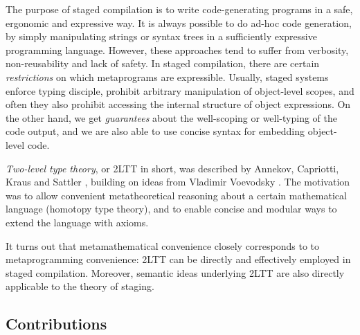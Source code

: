 \documentclass[acmsmall]{acmart}
\theoremstyle{remark}
\begin{document}
The purpose of staged compilation is to write code-generating programs in a
safe, ergonomic and expressive way. It is always possible to do ad-hoc code
generation, by simply manipulating strings or syntax trees in a sufficiently
expressive programming language. However, these approaches tend to suffer from
verbosity, non-reusability and lack of safety. In staged compilation, there are
certain \emph{restrictions} on which metaprograms are expressible. Usually,
staged systems enforce typing disciple, prohibit arbitrary manipulation of
object-level scopes, and often they also prohibit accessing the internal
structure of object expressions. On the other hand, we get \emph{guarantees}
about the well-scoping or well-typing of the code output, and we are also able
to use concise syntax for embedding object-level code.

\emph{Two-level type theory}, or 2LTT in short, was described by Annekov,
Capriotti, Kraus and Sattler \cite{twolevel}, building on ideas from Vladimir
Voevodsky \cite{hts}. The motivation was to allow convenient metatheoretical
reasoning about a certain mathematical language (homotopy type theory), and to
enable concise and modular ways to extend the language with axioms.

It turns out that metamathematical convenience closely corresponds to to
metaprogramming convenience: 2LTT can be directly and effectively employed
in staged compilation. Moreover, semantic ideas underlying 2LTT are also
directly applicable to the theory of staging.

\subsection{Contributions}
\end{document}
